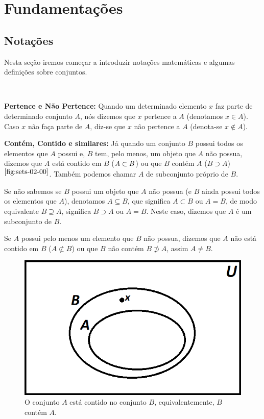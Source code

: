\section{Fundamentações}
  \subsection{Notações}
  Nesta seção iremos começar a introduzir notações matemáticas e algumas definições sobre conjuntos.

$\qquad$

  \textbf{Pertence e Não Pertence:} Quando um determinado elemento $x$ faz parte de determinado conjunto $A$, nós dizemos que $x$ pertence a $A$ (denotamos $x \in A$). Caso $x$ não faça parte de $A$, diz-se que $x$ não pertence a $A$ (denota-se  $x \notin A$).

  \textbf{Contém, Contido e similares:} Já quando um conjunto $B$ possui todos os elementos que $A$ possui e, $B$ tem, pelo menos, um objeto que $A$ não possua, dizemos que $A$ está contido em $B$ ($\space A \subset B$) ou que $B$ contém $A$ ($B \supset A$)$^{\ref{fig:sets-02-00}}$.  Também podemos chamar $A$ de subconjunto próprio de $B$.
  
  Se não sabemos se $B$ possui um objeto que $A$ não possua (e $B$ ainda possui todos os elementos que $A$), denotamos $A \subseteq B$, que significa $A \subset B$ ou $A=B$, de modo equivalente $B \supseteq A$, significa $B \supset A$ ou $A=B$. Neste caso, dizemos que $A$ é um subconjunto de $B$.
  
  
  Se $A$ possui pelo menos um elemento que $B$ não possua, dizemos que $A$ não está contido em $B$ ($A \not\subset B$) ou que $B$ não contém $B\not\supset A$, assim $A \neq B$.

  \begin{figure}[hbt!]
      \centering
      \includegraphics[width = 7 cm]{figures/sets/fig-sets-02-00.png}
      \caption{O conjunto $A$ está contido no conjunto $B$, equivalentemente, $B$ contém $A$.}
      \label{fig:sets-02-00}
  \end{figure}

